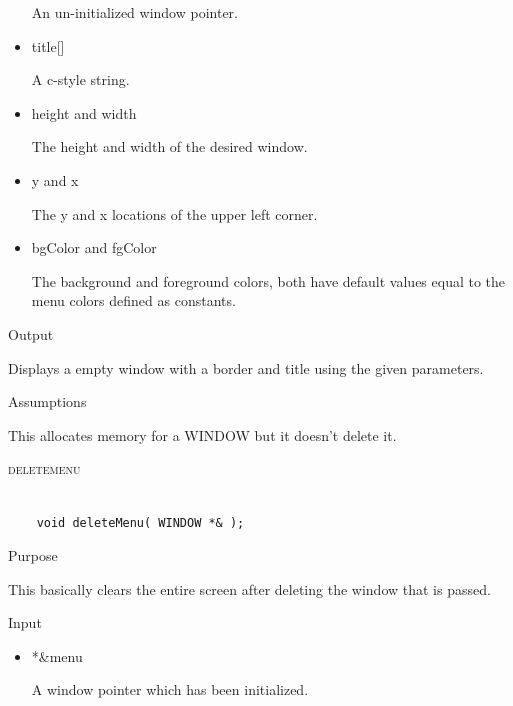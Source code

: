 \documentclass[pdftex, 11pt]{article}
\begin{document}
\begin{description}
\begin{description}
\begin{itemize}
						An un-initialized window pointer.

					\item{title[]}

						A c-style string.

					\item{height and width}

						The height and width of the desired window.

					\item{y and x}

						The y and x locations of the upper left corner.

					\item{bgColor and fgColor}

						The background and foreground colors, both have default values equal
						to the menu colors defined as constants.

				\end{itemize}

			\item{Output}

				Displays a empty window with a border and title using the
				given parameters.

			\item{Assumptions}

				This allocates memory for a WINDOW but it doesn't delete it.

		\end{description}


	\item{\textsc{deletemenu}}

		\begin{lstlisting}

	void deleteMenu( WINDOW *& );
		\end{lstlisting}

		\begin{description}
			\item{Purpose}

				This basically clears the entire screen after deleting the window that is
				passed.

			\item{Input}

				\begin{itemize}

					\item{*\&menu}

						A window pointer which has been initialized.	

				\end{itemize}


\end{description}
\end{description}
\end{document}
